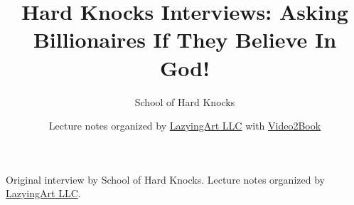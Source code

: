 \documentclass[11pt,oneside]{book}
\begin{document}
\frontmatter
\title{Hard Knocks Interviews: Asking Billionaires If They Believe In God!}
\author{School of Hard Knocks}
\date{Lecture notes organized by \href{https://lazying.art}{LazyingArt LLC} with \href{https://github.com/lachlanchen/Video2Book}{Video2Book}}
\maketitle
\begin{center}
\small Original interview by School of Hard Knocks. Lecture notes organized by \href{https://lazying.art}{LazyingArt LLC}.
\end{center}
\clearpage
\mainmatter

\end{document}
